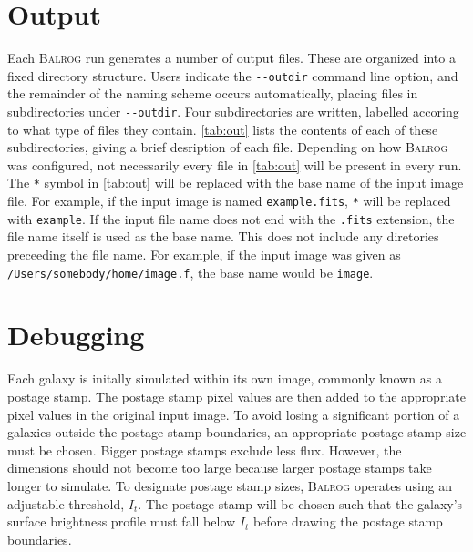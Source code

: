 \documentclass[12pt]{book}
\newcommand{\balrog}{\textsc{Balrog}}
\newcommand{\opt}[1]{{\texttt{-}\texttt{-#1}}}
\begin{document}
\chapter{Output}
\label{sec:out}
Each \balrog{} run generates a number of output files. 
These are organized into a fixed directory structure.
Users indicate the \opt{outdir} command line option, and
the remainder of the naming scheme occurs automatically,
placing files in subdirectories under \opt{outdir}.
Four subdirectories are written, labelled accoring to what
type of files they contain. \autoref{tab:out}
lists the contents of each of these subdirectories,
giving a brief desription of each file. Depending on how
\balrog{} was configured, not necessarily every file
in \autoref{tab:out} will be present in every run.
The \texttt{*} symbol in \autoref{tab:out} will be replaced with
the base name of the input image file. For example,
if the input image is named \texttt{example.fits},
\texttt{*} will be replaced with \texttt{example}.
If the input file name does not end with the \texttt{.fits}
extension, the file name itself is used as the base name.
This does not include any diretories preceeding the file name.
For example, if the input image was given as
\texttt{/Users/somebody/home/image.f}, the
base name would be \texttt{image}.

\outtab{}

\chapter{Debugging}
\label{sec:debug}

Each galaxy is initally simulated within its own image, commonly known as a postage stamp.
The postage stamp pixel values are then added to the appropriate pixel values in the original input image.
To avoid losing a significant portion of a galaxies outside the postage stamp boundaries,
an appropriate postage stamp size must be chosen. 
Bigger postage stamps exclude less flux.
However, the dimensions should not become too large because
larger postage stamps take longer to simulate.
To designate postage stamp sizes, \balrog{} operates using an adjustable threshold, $I_t$.
The postage stamp will be chosen such that the galaxy's surface brightness profile
must fall below $I_t$ before drawing the postage stamp boundaries.
\end{document}
